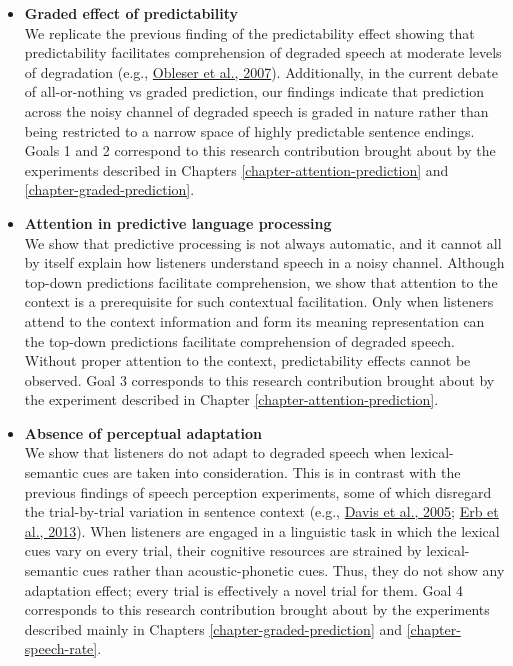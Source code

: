\documentclass[a4paper, nobind]{templates/ociamthesis}
\begin{document}
\begin{itemize}
\item
  \textbf{Graded effect of predictability}\\
  We replicate the previous finding of the predictability effect showing that predictability facilitates comprehension of degraded speech at moderate levels of degradation (e.g., \protect\hyperlink{ref-Obleser2007}{Obleser et al., 2007}).
  Additionally, in the current debate of all-or-nothing vs graded prediction, our findings indicate that prediction across the noisy channel of degraded speech is graded in nature
  rather than being restricted to a narrow space of highly predictable sentence endings.
  Goals 1 and 2 correspond to this research contribution brought about by the experiments described in Chapters \ref{chapter-attention-prediction} and \ref{chapter-graded-prediction}.
\item
  \textbf{Attention in predictive language processing}\\
  We show that predictive processing is not always automatic, and it cannot all by itself explain how listeners understand speech in a noisy channel.
  Although top-down predictions facilitate comprehension, we show that attention to the context is a prerequisite for such contextual facilitation.
  Only when listeners attend to the context information and form its meaning representation can the top-down predictions facilitate comprehension of degraded speech.
  Without proper attention to the context, predictability effects cannot be observed.
  Goal 3 corresponds to this research contribution brought about by the experiment described in Chapter \ref{chapter-attention-prediction}.
\item
  \textbf{Absence of perceptual adaptation}\\
  We show that listeners do not adapt to degraded speech when lexical-semantic cues are taken into consideration.
  This is in contrast with the previous findings of speech perception experiments, some of which disregard the trial-by-trial variation in sentence context (e.g., \protect\hyperlink{ref-Davis2005}{Davis et al., 2005}; \protect\hyperlink{ref-Erb2013}{Erb et al., 2013}).
  When listeners are engaged in a linguistic task in which the lexical cues vary on every trial,
  their cognitive resources are strained by lexical-semantic cues rather than acoustic-phonetic cues.
  Thus, they do not show any adaptation effect;
  every trial is effectively a novel trial for them.
  Goal 4 corresponds to this research contribution brought about by the experiments described mainly in Chapters \ref{chapter-graded-prediction} and \ref{chapter-speech-rate}.

\end{itemize}
\end{document}
